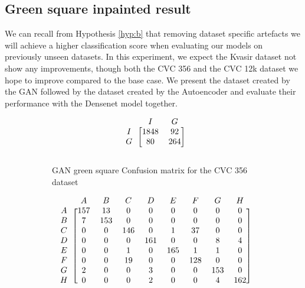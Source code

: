 \FloatBarrier
\subsection{Green square inpainted result}


We can recall from Hypothesis \ref{hyp:b} that removing dataset specific artefacts we will achieve a higher classification score when evaluating our models on previously unseen datasets.
In this experiment, we expect the Kvasir dataset not show any improvements, though both the CVC 356 and the CVC 12k dataset we hope to improve compared to the base case. 
We present the dataset created by the GAN followed by the dataset created by the Autoencoder and evaluate their performance with the Densenet model together.


\begin{figure}[h]
\myfontsize
\caption*{\footnotesize \textmd{ \textbf{A}:{dyed-lifted-polyps} , \textbf{B}:{dyed-resection-margins} , \textbf{C}:{esophagitis} , \textbf{D}:{normal-cecum} , \textbf{E}:{normal-pylorus} , \textbf{F}:{normal-z-line} , \textbf{G}:{polyps} , \textbf{H}:{ulcerative-colitis} , \textbf{I}:{non-polyp}}}

\begin{subfigure}[b]{0.25\textwidth}
     
\[
\begin{blockarray}{ccc}
& I & G  \\
\begin{block}{c[cc]}
        I&1848 &  92\\
        G& 80 &  264\\
\end{block}
\end{blockarray}
 \]         

\caption{GAN green square Confusion matrix for the CVC 356 dataset}
\label{mat:cvc356_CM_DN121_GAN_SQUARE}
\end{subfigure}
\begin{subfigure}[b]{0.49\textwidth}  
\scriptsize     
\[
\begin{blockarray}{ccccccccc}
& A & B & C & D & E & F & G & H \\
\begin{block}{c[cccccccc]}
A&157 & 13 & 0 & 0 & 0 & 0 & 0 & 0\\
B&  7 & 153 & 0 & 0 & 0 & 0 & 0 & 0\\
C&  0 & 0 & 146 & 0 & 1 & 37 & 0 & 0\\
D&  0 & 0 & 0 & 161 & 0 & 0 & 8 & 4\\
E&  0 & 0 & 1 & 0 & 165 & 1 & 1 & 0\\
F&  0 & 0 & 19 & 0 & 0 & 128 & 0 & 0\\
G&  2 & 0 & 0 & 3 & 0 & 0 & 153 & 0\\
H&  0 & 0 & 0 & 2 & 0 & 0 & 4 & 162\\
\end{block}
\end{blockarray}
 \]        
        

\end{subfigure}
\end{figure}
